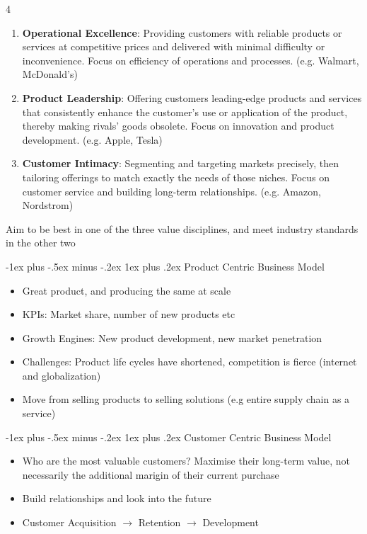 \documentclass[10pt, landscape]{article}
\makeatletter
\renewcommand{\subsubsection}{\@startsection{subsubsection}{3}{0mm}%
  {-1ex plus -.5ex minus -.2ex}%
  {1ex plus .2ex}%
{\normalfont\small\bfseries}}%
\makeatother
\begin{document}
\begin{multicols*}{4}
  \begin{enumerate}
    \item \textbf{Operational Excellence}: Providing customers with reliable products or services at competitive prices and delivered with minimal difficulty or inconvenience. Focus on efficiency of operations and processes. (e.g. Walmart, McDonald's)
    \item \textbf{Product Leadership}: Offering customers leading-edge products and services that consistently enhance the customer's use or application of the product, thereby making rivals' goods obsolete. Focus on innovation and product development. (e.g. Apple, Tesla)
    \item \textbf{Customer Intimacy}: Segmenting and targeting markets precisely, then tailoring offerings to match exactly the needs of those niches. Focus on customer service and building long-term relationships. (e.g. Amazon, Nordstrom)
  \end{enumerate}
  Aim to be best in one of the three value disciplines, and meet industry standards in the other two

  \subsubsection{Product Centric Business Model}
  \begin{itemize}
    \item Great product, and producing the same at scale
    \item KPIs: Market share, number of new products etc
    \item Growth Engines: New product development, new market penetration
    \item Challenges: Product life cycles have shortened, competition is fierce (internet and globalization)
    \item Move from selling products to selling solutions (e.g entire supply chain as a service)
  \end{itemize}
  \subsubsection{Customer Centric Business Model}
  \begin{itemize}
    \item Who are the most valuable customers? Maximise their long-term value, not necessarily the additional marigin of their current purchase
    \item Build relationships and look into the future
    \item Customer Acquisition $\rightarrow$ Retention $\rightarrow$ Development
  \end{itemize}


\end{multicols*}
\end{document}
